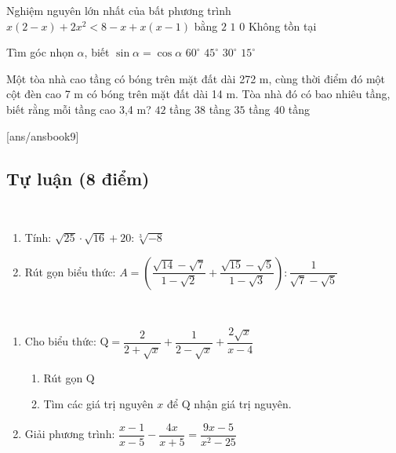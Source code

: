 \begin{ex}
Nghiệm nguyên lớn nhất của bất phương trình $x(2-x)+2x^2<8-x+x(x-1)$ bằng
\choice
{$2$}
{\True $1$}
{$0$}
{Không tồn tại}
\end{ex}

\begin{ex}
Tìm góc nhọn $\alpha$, biết $\sin \alpha=\cos \alpha$
\choice
{$60^\circ$}
{\True $45^\circ$}
{$30^\circ$}
{$15^\circ$}
\end{ex}

\begin{ex}
Một tòa nhà cao tầng có bóng trên mặt đất dài 272 m, cùng thời điểm đó một cột đèn cao 7 m có bóng trên mặt đất dài 14 m. Tòa nhà đó có bao nhiêu tầng, biết rằng mỗi tầng cao 3,4 m?
\choice
{$42$ tầng}
{$38$ tầng}
{$35$ tầng}
{\True $40$ tầng}
\end{ex}


[ans/ansbook9] 
\setcounter{bt}{0} 
\subsection{Tự luận (8 điểm)}
\begin{bt}[1,0 điểm] $ $
\begin{enumerate}
    \item Tính: $\sqrt{25}\cdot \sqrt{16}+20:\sqrt[3]{-8}$
    \item Rút gọn biểu thức: $A=\left(\dfrac{\sqrt{14}-\sqrt{7}}{1-\sqrt{2}}+\dfrac{\sqrt{15}-\sqrt{5}}{1-\sqrt{3}}\right): \dfrac{1}{\sqrt{7}-\sqrt{5}}$
\end{enumerate}
\end{bt}

\begin{bt}[2,0 điểm] $ $
\begin{enumerate}
    \item Cho biểu thức: $\mathrm{Q}=\dfrac{2}{2+\sqrt{x}}+\dfrac{1}{2-\sqrt{x}}+\dfrac{2 \sqrt{x}}{x-4}$
    \begin{enumerate}
        \item[i)] Rút gọn $\mathrm{Q}$
        \item[ii)] Tìm các giá trị nguyên $x$ để $\mathrm{Q}$ nhận giá trị nguyên.
    \end{enumerate}
    \item Giải phương trình: $\dfrac{x-1}{x-5}-\dfrac{4 x}{x+5}=\dfrac{9 x-5}{x^2-25}$
\end{enumerate}
\end{bt}

